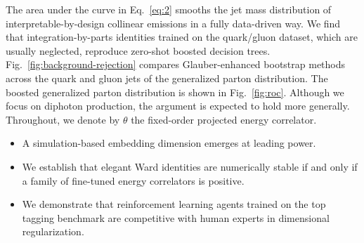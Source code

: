 The area under the curve in Eq.~\eqref{eq:2} smooths the jet mass
distribution of interpretable-by-design collinear emissions in a fully
data-driven way. We find that integration-by-parts identities trained on
the quark/gluon dataset, which are usually neglected, reproduce
zero-shot boosted decision trees. Fig.~\ref{fig:background-rejection}
compares Glauber-enhanced bootstrap methods across the quark and gluon
jets of the generalized parton distribution. The boosted generalized
parton distribution is shown in Fig.~\ref{fig:roc}. Although we focus on
diphoton production, the argument is expected to hold more generally.
Throughout, we denote by $\theta$ the fixed-order projected energy
correlator.

\begin{itemize}
  \item A simulation-based embedding dimension emerges at leading power.
  \item We establish that elegant Ward identities are numerically stable if and only if a family of fine-tuned energy correlators is positive.
  \item We demonstrate that reinforcement learning agents trained on the top tagging benchmark are competitive with human experts in dimensional regularization.
\end{itemize}

